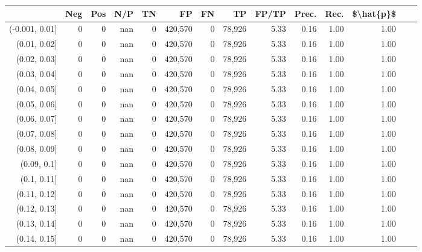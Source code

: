 \begin{tabular}{rrrrrrrrrrrrrr}
\toprule
{} &     Neg &     Pos &    N/P &       TN &       FP &      FN &      TP & FP/TP & Prec. &  Rec. & \$\textbackslash hat\{p\}\$ \\
\midrule
(-0.001, 0.01] &       0 &       0 &    nan &        0 &  420,570 &       0 &  78,926 &  5.33 &  0.16 &  1.00 &      1.00 \\
(0.01, 0.02]   &       0 &       0 &    nan &        0 &  420,570 &       0 &  78,926 &  5.33 &  0.16 &  1.00 &      1.00 \\
(0.02, 0.03]   &       0 &       0 &    nan &        0 &  420,570 &       0 &  78,926 &  5.33 &  0.16 &  1.00 &      1.00 \\
(0.03, 0.04]   &       0 &       0 &    nan &        0 &  420,570 &       0 &  78,926 &  5.33 &  0.16 &  1.00 &      1.00 \\
(0.04, 0.05]   &       0 &       0 &    nan &        0 &  420,570 &       0 &  78,926 &  5.33 &  0.16 &  1.00 &      1.00 \\
(0.05, 0.06]   &       0 &       0 &    nan &        0 &  420,570 &       0 &  78,926 &  5.33 &  0.16 &  1.00 &      1.00 \\
(0.06, 0.07]   &       0 &       0 &    nan &        0 &  420,570 &       0 &  78,926 &  5.33 &  0.16 &  1.00 &      1.00 \\
(0.07, 0.08]   &       0 &       0 &    nan &        0 &  420,570 &       0 &  78,926 &  5.33 &  0.16 &  1.00 &      1.00 \\
(0.08, 0.09]   &       0 &       0 &    nan &        0 &  420,570 &       0 &  78,926 &  5.33 &  0.16 &  1.00 &      1.00 \\
(0.09, 0.1]    &       0 &       0 &    nan &        0 &  420,570 &       0 &  78,926 &  5.33 &  0.16 &  1.00 &      1.00 \\
(0.1, 0.11]    &       0 &       0 &    nan &        0 &  420,570 &       0 &  78,926 &  5.33 &  0.16 &  1.00 &      1.00 \\
(0.11, 0.12]   &       0 &       0 &    nan &        0 &  420,570 &       0 &  78,926 &  5.33 &  0.16 &  1.00 &      1.00 \\
(0.12, 0.13]   &       0 &       0 &    nan &        0 &  420,570 &       0 &  78,926 &  5.33 &  0.16 &  1.00 &      1.00 \\
(0.13, 0.14]   &       0 &       0 &    nan &        0 &  420,570 &       0 &  78,926 &  5.33 &  0.16 &  1.00 &      1.00 \\
(0.14, 0.15]   &       0 &       0 &    nan &        0 &  420,570 &       0 &  78,926 &  5.33 &  0.16 &  1.00 &      1.00 \\

\end{tabular}
